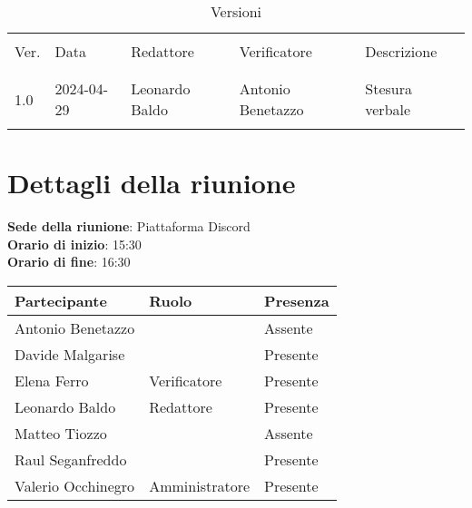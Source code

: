 \documentclass[italian,12pt]{article}
\begin{document}


\newpage



\begin{table}[!h]
	\caption{Versioni}
	\footnotesize
	\begin{center}
		\begin{tabular}{ l l l l l }
			\hline \\[-2ex]
			Ver. & Data       & Redattore      & Verificatore      & Descrizione     \\
			\\[-2ex] \hline \\[-1.5ex]
			1.0  & 2024-04-29 & Leonardo Baldo & Antonio Benetazzo & Stesura verbale \\
			\\[-1.5ex] \hline
		\end{tabular}
	\end{center}
\end{table}

\newpage

\tableofcontents

\newpage

\section{Dettagli della riunione}


\textbf{Sede della riunione}: Piattaforma Discord\\
\textbf{Orario di inizio}: 15:30\\
\textbf{Orario di fine}: 16:30\\


\begin{flushleft}
	\begin{table}[!h]
	\begin{tabular}{ |l|l|l| } 
		\hline
		\textbf{Partecipante} & \textbf{Ruolo}       & \textbf{Presenza} \\
		\hline 
		Antonio Benetazzo     &                      & Assente           \\
		Davide Malgarise      &                      & Presente          \\
		Elena Ferro           & Verificatore         & Presente          \\
		Leonardo Baldo        & Redattore            & Presente          \\
		Matteo Tiozzo         &                      & Assente           \\
		Raul Seganfreddo      &                      & Presente          \\
		Valerio Occhinegro    & Amministratore       & Presente          \\
		\hline
	\end{tabular}
	\end{table}
\end{flushleft}
\end{document}

